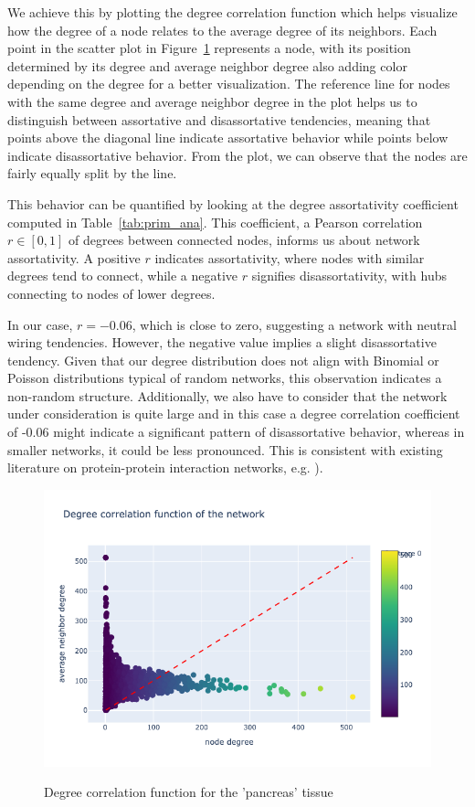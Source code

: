 \documentclass[paper=a4,fontsize=11pt,DIV=8,BCOR=5mm,oneside,pdftex,bibtotocnumbered]{scrreprt}
\theoremstyle{plain}
\begin{document}
	We achieve this by plotting the degree correlation function which helps visualize how the degree of a node relates to the average degree of its neighbors. Each point in the scatter plot in Figure~\ref{fig:degree_corr_fct} represents a node, with its position determined by its degree and average neighbor degree also adding color depending on the degree for a better visualization. The reference line for nodes with the same degree and average neighbor degree in the plot helps us to distinguish between assortative and disassortative tendencies, meaning that points above the diagonal line indicate assortative behavior while points below indicate disassortative behavior. From the plot, we can observe that the nodes are fairly equally split by the line. 
	
	This behavior can be quantified by looking at the degree assortativity coefficient computed in Table~\ref{tab:prim_ana}. This coefficient, a Pearson correlation \( r \in [0,1] \) of degrees between connected nodes, informs us about network assortativity. A positive \( r \) indicates assortativity, where nodes with similar degrees tend to connect, while a negative \( r \) signifies disassortativity, with hubs connecting to nodes of lower degrees.
	
	In our case, \( r = -0.06 \), which is close to zero, suggesting a network with neutral wiring tendencies. However, the negative value implies a slight disassortative tendency. Given that our degree distribution does not align with Binomial or Poisson distributions typical of random networks, this observation indicates a non-random structure. Additionally, we also have to consider that the network under consideration is quite large and in this case a degree correlation coefficient of -0.06 might indicate a significant pattern of disassortative behavior, whereas in smaller networks, it could be less pronounced. This is consistent with existing literature on protein-protein interaction networks, e.g. \cite[Chapter 7.1]{Barabasi2015}).
	
	\begin{figure}
		\centering
		\caption{Degree correlation function for the 'pancreas' tissue}
		\includegraphics[scale=0.6]{degree_correlation_fct.png}
		\label{fig:degree_corr_fct}
	\end{figure}
	
\end{document}
